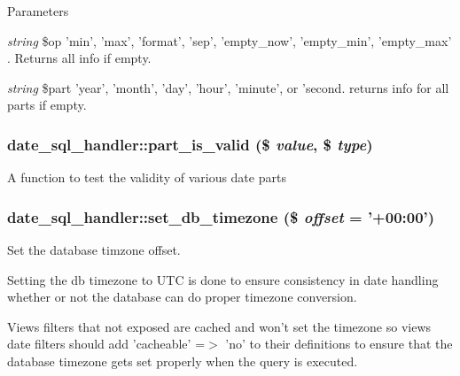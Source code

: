 \begin{DoxyParams}{Parameters}
\item[{\em string}]\$op 'min', 'max', 'format', 'sep', 'empty\_\-now', 'empty\_\-min', 'empty\_\-max' . Returns all info if empty. \item[{\em string}]\$part 'year', 'month', 'day', 'hour', 'minute', or 'second. returns info for all parts if empty. \end{DoxyParams}
\hypertarget{classdate__sql__handler_af0dc94f9fde296bc8dce819235ba387b}{
\subsubsection[{part\_\-is\_\-valid}]{\setlength{\rightskip}{0pt plus 5cm}date\_\-sql\_\-handler::part\_\-is\_\-valid (\$ {\em value}, \/  \$ {\em type})}}
\label{classdate__sql__handler_af0dc94f9fde296bc8dce819235ba387b}
A function to test the validity of various date parts \hypertarget{classdate__sql__handler_a3b90dc8718e14ec4ae3b2ee7f2d81cfd}{
\subsubsection[{set\_\-db\_\-timezone}]{\setlength{\rightskip}{0pt plus 5cm}date\_\-sql\_\-handler::set\_\-db\_\-timezone (\$ {\em offset} = {\ttfamily '+00:00'})}}
\label{classdate__sql__handler_a3b90dc8718e14ec4ae3b2ee7f2d81cfd}
Set the database timzone offset.

Setting the db timezone to UTC is done to ensure consistency in date handling whether or not the database can do proper timezone conversion.

Views filters that not exposed are cached and won't set the timezone so views date filters should add 'cacheable' =$>$ 'no' to their definitions to ensure that the database timezone gets set properly when the query is executed.


